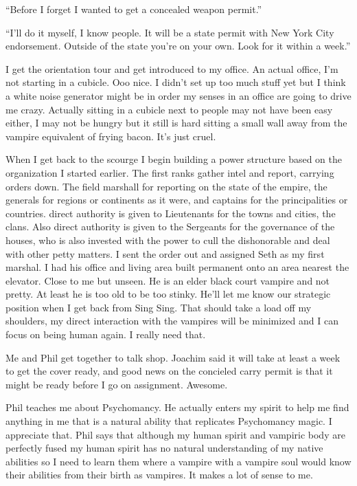 ``Before I forget I wanted to get a concealed weapon permit.''

``I'll do it myself, I know people. It will be a state permit with New York City endorsement. Outside of the state you're on your own. Look for it within a week.''

I get the orientation tour and get introduced to my office. An actual office, I'm not starting in a cubicle. Ooo nice. I didn't set up too much stuff yet but I think a white noise generator might be in order my senses in an office are going to drive me crazy. Actually sitting in a cubicle next to people may not have been easy either, I may not be hungry but it still is hard sitting a small wall away from the vampire equivalent of frying bacon. It's just cruel.

When I get back to the scourge I begin building a power structure based on the organization I started earlier.  The first ranks gather intel and report, carrying orders down. The field marshall for reporting on the state of the empire, the generals for regions or continents as it were, and captains for the principalities or countries. direct authority is given to Lieutenants for the towns and cities, the clans. Also direct authority is given to the Sergeants for the governance of the houses, who is also invested with the power to cull the dishonorable and deal with other petty matters. I sent the order out and assigned Seth as my first marshal. I had his office and living area built permanent onto an area nearest the elevator. Close to me but unseen. He is an elder black court vampire and not pretty. At least he is too old to be too stinky. He'll let me know our strategic position when I get back from Sing Sing. That should take a load off my shoulders, my direct interaction with the vampires will be minimized and I can focus on being human again. I really need that.

Me and Phil get together to talk shop. Joachim said it will take at least a week to get the cover ready, and good news on the concieled carry permit is that it might be ready before I go on assignment. Awesome.

Phil teaches me about Psychomancy. He actually enters my spirit to help me find anything in me that is a natural ability that replicates Psychomancy magic. I appreciate that. Phil says that although my human spirit and vampiric body are perfectly fused my human spirit has no natural understanding of my native abilities so I need to learn them where a vampire with a vampire soul would know their abilities from their birth as vampires. It makes a lot of sense to me.

